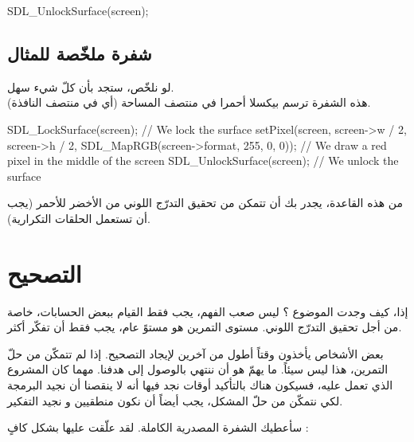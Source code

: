 \begin{Csource}
SDL_UnlockSurface(screen);
\end{Csource}

\subsection{شفرة  ملخّصة للمثال}

لو نلخّص، ستجد بأن كلّ شيء سهل.\\
هذه الشفرة ترسم بيكسلا أحمرا في منتصف المساحة
(أي في منتصف النافذة).

\begin{Csource}
SDL_LockSurface(screen); // We lock the surface
setPixel(screen, screen->w / 2, screen->h / 2, SDL_MapRGB(screen->format, 255, 0, 0)); // We draw a red pixel in the middle of the screen
SDL_UnlockSurface(screen); // We unlock the surface
\end{Csource}

من هذه القاعدة، يجدر بك أن تتمكن من تحقيق التدرّج اللوني من الأخضر للأحمر (يجب أن تستعمل الحلقات التكرارية).

\section{التصحيح}

إذا، كيف وجدت الموضوع ؟ ليس صعب الفهم، يجب فقط القيام ببعض الحسابات، خاصة من أجل تحقيق التدرّج اللوني. مستوى التمرين هو مستوً عام، يجب فقط أن تفكّر أكثر. 

بعض الأشخاص يأخذون وقتاً أطول من آخرين لإيجاد التصحيح. إذا لم تتمكّن من حلّ التمرين، هذا ليس سيئاً. ما يهمّ هو أن ننتهي بالوصول إلى هدفنا. مهما كان المشروع الذي تعمل عليه، فسيكون هناك بالتأكيد أوقات نجد فيها أنه لا ينقصنا أن نجيد البرمجة لكي نتمكّن من حلّ المشكل، يجب أيضاً أن نكون منطقيين و نجيد التفكير.

سأعطيك الشفرة المصدرية الكاملة. لقد علّقت عليها بشكل كافٍ :

